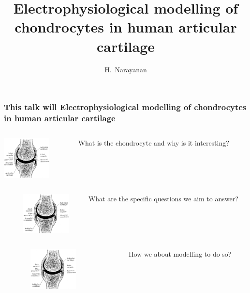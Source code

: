 \documentclass[ignorenonframetext]{beamer}
\title{Electrophysiological modelling of chondrocytes in human
  articular cartilage}
\author{H.~Narayanan}
\institute[]{}
\date[]{}
\begin{document}
%
%
%


\begin{frame}
  \frametitle{This talk will Electrophysiological modelling of
    chondrocytes in human articular cartilage}
  \begin{columns}
    \begin{column}{3cm}
      \includegraphics[width=2.5cm]{../images/pdf/joint}
    \end{column}
    \begin{column}{9cm}
      What is the chondrocyte and why is it interesting?
    \end{column}
  \end{columns}
  \vspace{0.2cm}
  \begin{columns}
    \begin{column}{0.5cm}
    \end{column}
    \begin{column}{4.5cm}
      \includegraphics[width=2.5cm]{../images/pdf/joint}
    \end{column}
    \begin{column}{7cm}
      What are the specific questions we aim to answer?
    \end{column}
  \end{columns}
  \vspace{0.2cm}
  \begin{columns}
    \begin{column}{3.5cm}
    \end{column}
    \begin{column}{3cm}
      \includegraphics[width=2.5cm]{../images/pdf/joint}
    \end{column}
    \begin{column}{0.5cm}
    \end{column}
    \begin{column}{5cm}
      How we about modelling to do so?


\end{column}
\end{columns}
\end{frame}
\end{document}
